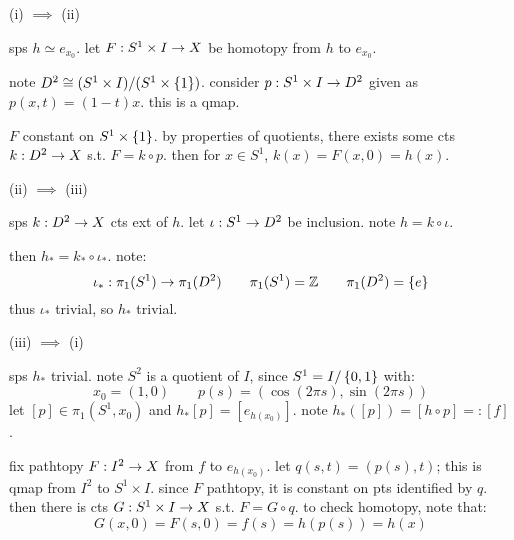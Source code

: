 \newpage
\begin{pf}[source=Primary Source Material]
    (i) $\implies$ (ii)
    \begin{block}
        sps $h\simeq e_{x_{0}}$. let $F:S^{1}\times I\rightarrow X$ be homotopy from $h$ to $e_{x_{0}}$.

        note $D^{2}\cong(S^{1}\times I)/(S^{1}\times\left\{{1}\right\})$.
        consider $p:S^{1}\times I\rightarrow D^{2}$ given as $p(x,t)=(1-t)x$.
        this is a qmap.

        $F$ constant on $S^{1}\times\left\{{1}\right\}$.
        by properties of quotients, there exists some cts $k:D^{2}\rightarrow X$ s.t. $F=k\circ p$.
        then for $x\in S^{1}$, $k(x)=F(x,0)=h(x)$.
    \end{block}

    (ii) $\implies$ (iii)
    \begin{block}
        sps $k:D^{2}\rightarrow X$ cts ext of $h$.
        let $\iota:S^{1}\rightarrow D^{2}$ be inclusion. note $h=k\circ\iota$.
        
        then $h_{*}=k_{*}\circ\iota_{*}$. note:
        \begin{equation*}
            \iota_{*}:\pi_{1}(S^{1})\rightarrow\pi_{1}(D^{2}) \qquad
            \pi_{1}(S^{1})=\mathbb{Z} \qquad \pi_{1}(D^{2})=\left\{{e}\right\}
        \end{equation*}
        thus $\iota_{*}$ trivial, so $h_{*}$ trivial.
    \end{block}

    (iii) $\implies$ (i)
    \begin{block}
        sps $h_{*}$ trivial.
        note $S^{2}$ is a quotient of $I$, since $S^{1}=I/\left\{{0,1}\right\}$ with:
        \begin{equation*}
            x_{0}=(1,0) \qquad p(s)=(\cos(2\pi s),\sin(2\pi s))
        \end{equation*}
        let $[p]\in\pi_{1}(S^{1},x_{0})$ and $h_{*}[p]=[e_{h(x_{0})}]$.
        note $h_{*}([p])=[h\circ p]=:[f]$.

        fix pathtopy $F:I^{2}\rightarrow X$ from $f$ to $e_{h(x_{0})}$.
        let $q(s,t)=(p(s),t)$; this is qmap from $I^{2}$ to $S^{1}\times I$.
        since $F$ pathtopy, it is constant on pts identified by $q$.
        then there is cts $G:S^{1}\times I\rightarrow X$ s.t. $F=G\circ q$.
        to check homotopy, note that:
        \begin{equation*}
            G(x,0)=F(s,0)=f(s)=h(p(s))=h(x)
        \end{equation*}
    \end{block}
\end{pf}

